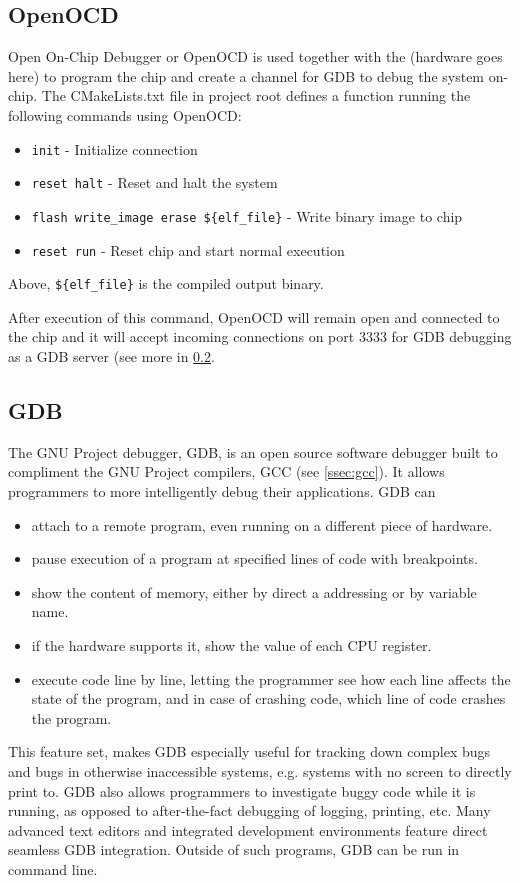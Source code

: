 \subsection{OpenOCD}
\label{ssec:openocd}
Open On-Chip Debugger or OpenOCD \cite{openocd} is used together with the (hardware goes here) to program the chip and create a channel for GDB to debug the system on-chip.
The CMakeLists.txt file in project root defines a function running the following commands using OpenOCD:

\begin{itemize}
	\item \texttt{init} - Initialize connection
	\item \texttt{reset halt} - Reset and halt the system
	\item \texttt{flash write\_image erase \$\{elf\_file\}} - Write binary image to chip
	\item \texttt{reset run} - Reset chip and start normal execution
\end{itemize}

Above, \texttt{\$\{elf\_file\}} is the compiled output binary.

After execution of this command, OpenOCD will remain open and connected to the
chip and it will accept incoming connections on port 3333 for
GDB debugging as a GDB server (see more in \ref{ssec:gdb}.

\subsection{GDB}
\label{ssec:gdb}
The GNU Project debugger\cite{gdb}, GDB, is an open source software debugger
built to compliment the GNU Project compilers, GCC (see \ref{ssec:gcc}). It
allows programmers to more intelligently debug their applications.
GDB can\\
\begin{itemize}
	\item attach to a remote program, even running on a different piece of
	hardware. 
	\item pause execution of a program at specified lines of code with
	breakpoints.
	\item show the content of memory, either by direct a addressing or by
	variable name.
	\item if the hardware supports it, show the value of each CPU register.
	\item execute code line by line, letting the programmer see how each line
	affects the state of the program, and in case of crashing code, which line
	of code crashes the program.
\end{itemize}
This feature set, makes GDB especially useful for tracking down complex bugs and
bugs in otherwise inaccessible systems, e.g. systems with no screen to directly 
print to. GDB also allows programmers to investigate buggy code while it is
running, as opposed to after-the-fact debugging of logging, printing, etc.
Many advanced text editors and integrated development environments feature
direct seamless GDB integration. Outside of such programs, GDB can be run in 
command line.

